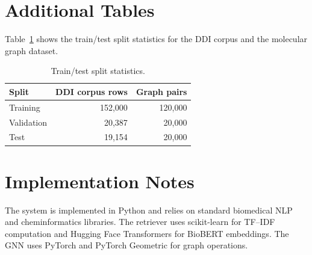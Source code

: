 \documentclass[conference]{IEEEtran}
\begin{document}
\section{Additional Tables}
Table~\ref{tab:split_stats} shows the train/test split statistics for the DDI corpus and the molecular graph dataset.

\begin{table}[t]
    \centering
    \caption{Train/test split statistics.}
    \label{tab:split_stats}
    \begin{tabular}{@{}lrr@{}}
    \toprule
    Split & DDI corpus rows & Graph pairs \\
    \midrule
    Training & 152,000 & 120,000 \\
    Validation & 20,387 & 20,000 \\
    Test & 19,154 & 20,000 \\
    \bottomrule
    \end{tabular}
\end{table}

\section{Implementation Notes}
The system is implemented in Python and relies on standard biomedical NLP and cheminformatics libraries. The retriever uses scikit-learn for TF--IDF computation and Hugging Face Transformers for BioBERT embeddings. The GNN uses PyTorch and PyTorch Geometric for graph operations.
\end{document}
